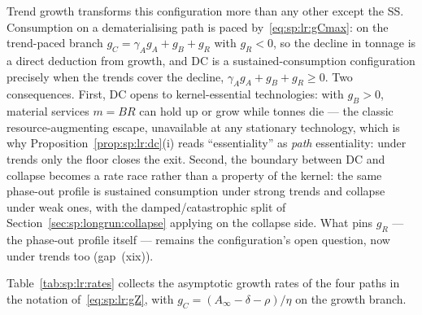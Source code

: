  Trend growth transforms this
configuration more than any other except the SS. Consumption on a dematerialising path is
paced by~\eqref{eq:sp:lr:gCmax}: on the trend-paced branch
$g_C=\gamma_Ag_A+g_B+g_R$ with $g_R<0$, so the decline in tonnage is a direct deduction from
growth, and DC is a sustained-consumption configuration precisely when the trends cover the
decline, $\gamma_Ag_A+g_B+g_R\ge0$. Two consequences. First, DC opens to kernel-essential
technologies: with $g_B>0$, material services $m=BR$ can hold up or grow while tonnes die
--- the classic resource-augmenting escape, unavailable at any stationary technology, which
is why Proposition~\ref{prop:sp:lr:dc}(i) reads ``essentiality'' as \emph{path}
essentiality: under trends only the floor closes the exit. Second, the boundary between DC
and collapse becomes a rate race rather than a property of the kernel: the same phase-out
profile is sustained consumption under strong trends and collapse under weak ones, with the
damped/catastrophic split of Section~\ref{sec:sp:longrun:collapse} applying on the collapse
side. What pins $g_R$ --- the phase-out profile itself --- remains the configuration's open
question, now under trends too (gap~(xix)).

 Table~\ref{tab:sp:lr:rates} collects the asymptotic
growth rates of the four paths in the notation of~\eqref{eq:sp:lr:gZ}, with
$g_C=\left(A_\infty-\delta-\rho\right)/\eta$ on the growth branch.

